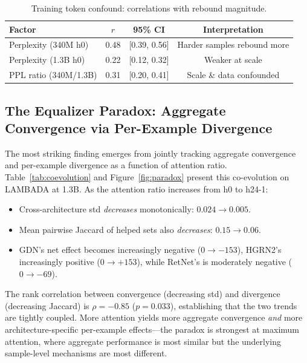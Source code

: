 \documentclass[11pt,a4paper]{article}
\begin{document}
\begin{table}[t]
\centering
\small
\caption{Training token confound: correlations with rebound magnitude.}
\label{tab:confound}
\begin{tabular}{@{}lccc@{}}
\toprule
Factor & $r$ & 95\% CI & Interpretation \\
\midrule
Perplexity (340M h0) & 0.48 & [0.39, 0.56] & Harder samples rebound more \\
Perplexity (1.3B h0) & 0.22 & [0.12, 0.32] & Weaker at scale \\
PPL ratio (340M/1.3B) & 0.31 & [0.20, 0.41] & Scale \& data confounded \\
\bottomrule
\end{tabular}
\end{table}

\subsection{The Equalizer Paradox: Aggregate Convergence via Per-Example Divergence}
\label{sec:paradox}

The most striking finding emerges from jointly tracking aggregate convergence and per-example divergence as a function of attention ratio. Table~\ref{tab:coevolution} and Figure~\ref{fig:paradox} present this co-evolution on LAMBADA at 1.3B. As the attention ratio increases from h0 to h24-1:

\begin{itemize}
    \item Cross-architecture std \emph{decreases} monotonically: $0.024 \to 0.005$.
    \item Mean pairwise Jaccard of helped sets also \emph{decreases}: $0.15 \to 0.06$.
    \item GDN's net effect becomes increasingly negative ($0 \to {-}153$), HGRN2's increasingly positive ($0 \to {+}153$), while RetNet's is moderately negative ($0 \to {-}69$).
\end{itemize}

The rank correlation between convergence (decreasing std) and divergence (decreasing Jaccard) is $\rho{=}{-}0.85$ ($p{=}0.033$), establishing that the two trends are tightly coupled. More attention yields more aggregate convergence \emph{and} more architecture-specific per-example effects---the paradox is strongest at maximum attention, where aggregate performance is most similar but the underlying sample-level mechanisms are most different.
\end{document}

